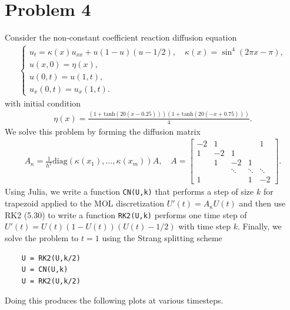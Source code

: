 \documentclass{article}
\begin{document}
\section{Problem 4}
Consider the non-constant coefficient reaction diffusion equation
\begin{align*}
	\begin{cases}
		u_t = \kappa(x) u_{xx} + u(1-u)(u-1/2), \quad \kappa(x) = \sin^4(2\pi x - \pi),\\
		u(x,0) = \eta(x),\\
		u(0,t) = u(1,t),\\
		u_x(0,t) = u_x(1,t).
	\end{cases}
\end{align*}
with initial condition
\begin{align*}
	\eta(x) = \frac{ ( 1 + \mathrm{tanh}(20(x-0.25)) ) ( 1 + \mathrm{tanh}(20(-x+0.75)))}{4}.
\end{align*}
We solve this problem by forming the diffusion matrix
\begin{align*}
	A_{\kappa} = \frac{1}{h^2} \mathrm{diag}(\kappa(x_1),\ldots,\kappa(x_m)) A, \quad A  = \begin{bmatrix}
		-2  & 1 &&& 1\\
		1 & -2 & 1 \\
		& 1 & -2 & 1\\
		&& \ddots & \ddots & \ddots \\
		1&&& 1 & -2 \end{bmatrix}.
\end{align*}
Using Julia, we write a function {\tt CN(U,k)} that performs a step of size $k$ for trapezoid applied to the MOL discretization $U'(t) = A_{\kappa} U(t)$ and then use RK2 (5.30) to write a function {\tt RK2(U,k)} performs one time step of $U'(t) = U(t)(1-U(t))(U(t) - 1/2)$ with time step $k$. Finally, we solve the problem to $t=1$ using the Strang splitting scheme 
\begin{verbatim}
	U = RK2(U,k/2)
	U = CN(U,k)
	U = RK2(U,k/2)
\end{verbatim}
Doing this produces the following plots at various timesteps.
\end{document}
